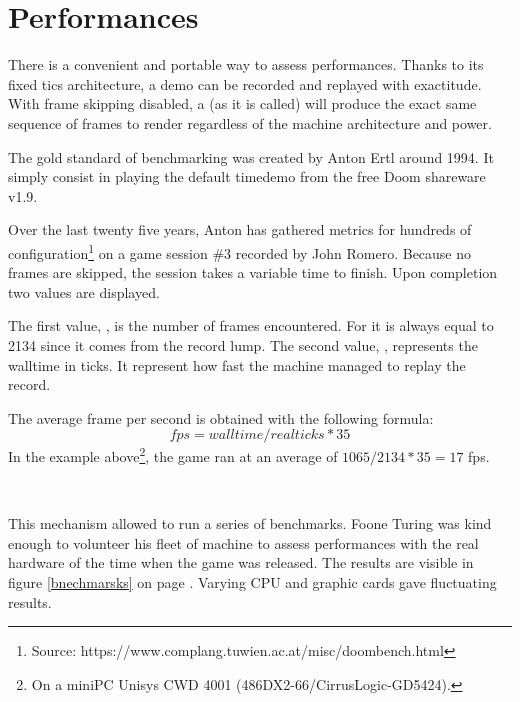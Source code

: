 \section{Performances}
There is a convenient and portable way to assess performances. Thanks to its fixed tics architecture, a demo can be recorded and replayed with exactitude. With frame skipping disabled, a  (as it is called) will produce the exact same sequence of frames to render regardless of the machine architecture and power.\\
\par
The gold standard of \doom benchmarking was created by Anton Ertl around 1994. It simply consist in playing the default timedemo from the free Doom shareware v1.9.\\
\par
{}
\par
Over the last twenty five years, Anton has gathered metrics for hundreds of configuration\footnote{Source: https://www.complang.tuwien.ac.at/misc/doombench.html} on a game session \#3 recorded by John Romero. Because no frames are skipped, the session takes a variable time to finish. Upon completion two values are displayed.\\
\par
{}
\par

The first value, , is the number of frames encountered. For  it is always equal to 2134 since it comes from the record lump. The second value, , represents the walltime in ticks. It represent how fast the machine managed to replay the record.\\
\par
 The average frame per second is obtained with the following formula: $$ fps = walltime/realticks * 35 $$ 
In the example above\footnote{On a miniPC Unisys CWD 4001 (486DX2-66/CirrusLogic-GD5424).}, the game ran at an average of $1065/2134*35 = 17$ fps. \\
\par
{}\\
\par
This mechanism allowed to run a series of benchmarks. Foone Turing was kind enough to volunteer his fleet of machine to assess performances with the real hardware of the time when the game was released. The results are visible in figure \ref{bnechmarsks} on page \pageref{bnechmarsks}. Varying CPU and graphic cards gave fluctuating results.\\
\par

